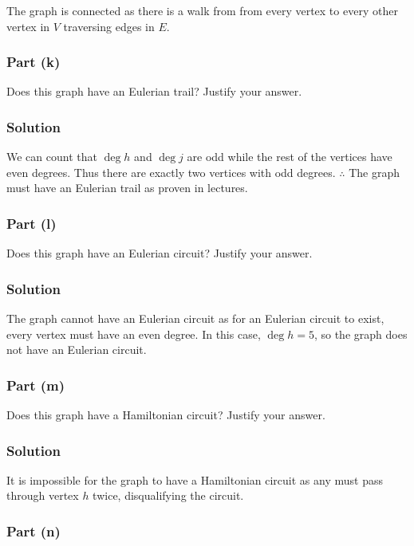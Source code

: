 \documentclass[12pt]{article}
\begin{document}
The graph is connected as there is a walk from from every vertex to every other vertex in $V$ traversing edges in $E$.

\subsubsection*{Part (k)}

Does this graph have an Eulerian trail? Justify your answer.

\subsubsection*{Solution}

We can count that $\deg h$ and $\deg j$ are odd while the rest of the vertices have even degrees. Thus there are exactly two vertices with odd degrees.
$\therefore$ The graph must have an Eulerian trail as proven in lectures.

\pagebreak
\subsubsection*{Part (l)}

Does this graph have an Eulerian circuit? Justify your answer.

\subsubsection*{Solution}

The graph cannot have an Eulerian circuit as for an Eulerian circuit to exist, every vertex must have an even degree.
In this case, $\deg h = 5$, so the graph does not have an Eulerian circuit.

\subsubsection*{Part (m)}

Does this graph have a Hamiltonian circuit? Justify your answer.

\subsubsection*{Solution}

It is impossible for the graph to have a Hamiltonian circuit as any must pass through vertex $h$ twice, disqualifying the circuit.

\subsubsection*{Part (n)}
\end{document}
